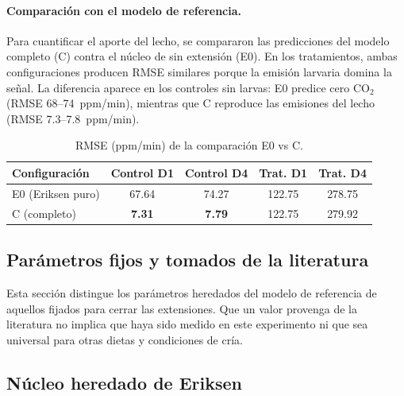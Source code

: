 \paragraph{Comparación con el modelo de referencia.}
Para cuantificar el aporte del lecho, se compararon las predicciones del modelo completo (C) contra el núcleo de \textcite{eriksen2022} sin extensión (E0). En los tratamientos, ambas configuraciones producen RMSE similares porque la emisión larvaria domina la señal. La diferencia aparece en los controles sin larvas: E0 predice cero CO$_2$ (RMSE 68--74~ppm/min), mientras que C reproduce las emisiones del lecho (RMSE 7.3--7.8~ppm/min).

\begin{table}[htbp]
  \centering
  \small
  \caption{RMSE (ppm/min) de la comparación E0 vs C.}
  \label{tab:s6-comparacion}
  \begin{tabular}{lcccc}
    \toprule
    Configuración & Control D1 & Control D4 & Trat. D1 & Trat. D4 \\
    \midrule
    E0 (Eriksen puro) & 67.64 & 74.27 & 122.75 & 278.75 \\
    C (completo) & \textbf{7.31} & \textbf{7.79} & 122.75 & 279.92 \\
    \bottomrule
  \end{tabular}
\end{table}

\subsection{Parámetros fijos y tomados de la literatura}
\label{sup:params}
Esta sección distingue los parámetros heredados del modelo de referencia de
aquellos fijados para cerrar las extensiones. Que un valor provenga de la
literatura no implica que haya sido medido en este experimento ni que sea
universal para otras dietas y condiciones de cría.

\subsection*{Núcleo heredado de Eriksen}

